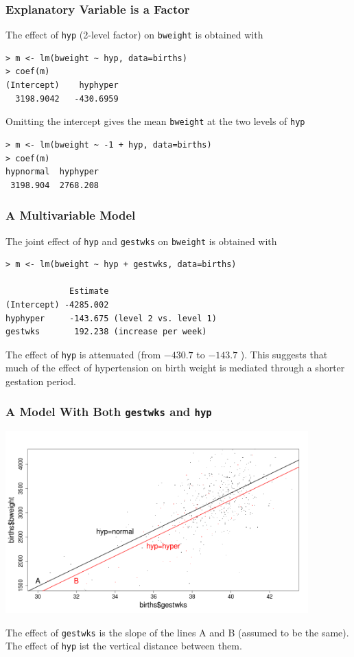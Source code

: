\documentclass[xcolor={table}]{beamer}
\begin{document}
\begin{frame}[fragile]\frametitle{Explanatory Variable is a Factor}
The effect of \texttt{hyp} (2-level factor) on \texttt{bweight} is obtained with
\begin{verbatim}
> m <- lm(bweight ~ hyp, data=births)
> coef(m)
(Intercept)    hyphyper 
  3198.9042   -430.6959 
\end{verbatim}
Omitting the intercept gives the mean \texttt{bweight} at the two levels of \texttt{hyp}
\begin{verbatim}
> m <- lm(bweight ~ -1 + hyp, data=births)
> coef(m)
hypnormal  hyphyper 
 3198.904  2768.208
\end{verbatim}
\end{frame}


\begin{frame}[fragile]\frametitle{A Multivariable Model}
The joint effect of \texttt{hyp} and \texttt{gestwks} on \texttt{bweight} is obtained with
\begin{verbatim}
> m <- lm(bweight ~ hyp + gestwks, data=births)

             Estimate 
(Intercept) -4285.002 
hyphyper     -143.675 (level 2 vs. level 1)
gestwks       192.238 (increase per week)
\end{verbatim}

The effect of \texttt{hyp} is attenuated (from $-430.7$ to $-143.7$ ). This suggests that much of the effect of hypertension on birth weight is mediated through a shorter gestation period.
\end{frame}

\begin{frame}[shrink=5]\frametitle{A Model With Both \texttt{gestwks} and  \texttt{hyp}}
\includegraphics[height=7cm]{model1.png}

The effect of \texttt{gestwks} is the slope of the lines A and B (assumed to be the same). The effect of \texttt{hyp} ist the vertical distance between them.
\end{frame}
\end{document}
